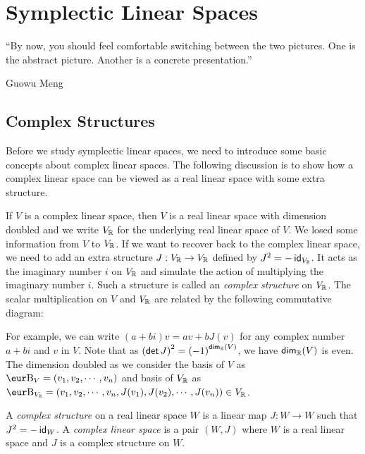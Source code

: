 \chapter{Symplectic Linear Spaces}

\epigraph{``By now, you should feel comfortable switching between the two pictures. One is the abstract picture. Another is a concrete presentation.''}{Guowu Meng}

\section{Complex Structures}

Before we study symplectic linear spaces, we need to introduce some basic concepts about complex linear spaces. The following discussion is to show how a complex linear space can be viewed as a real linear space with some extra structure.

If $V$ is a complex linear space, then $V$ is a real linear space with dimension doubled and we write $V_{\operatorname{\mathbb{R}}}$ for the underlying real linear space of $V$. We losed some information from $V$ to $V_{\operatorname{\mathbb{R}}}$. If we want to recover back to the complex linear space, we need to add an extra structure $J : V_{\operatorname{\mathbb{R}}} \to V_{\operatorname{\mathbb{R}}}$ defined by $J^2 = -\operatorname{\text{\normalfont\sffamily id}}_{V_{\operatorname{\mathbb{R}}}}$. It acts as the imaginary number $i$ on $V_{\operatorname{\mathbb{R}}}$ and simulate the action of multiplying the imaginary number $i$. Such a structure is called an \emph{complex structure} on $V_{\operatorname{\mathbb{R}}}$. The scalar multiplication on $V$ and $V_{\operatorname{\mathbb{R}}}$ are related by the following commutative diagram:
\begin{center}
\end{center}
For example, we can write $(a + bi) v = a v + b J(v)$ for any complex number $a + bi$ and $v$ in $V$. Note that as ${(\operatorname{\text{\normalfont\sffamily det}} J)}^2 = {(-1)}^{\operatorname{\text{\normalfont\sffamily dim}}_{\operatorname{\mathbb{R}}}(V)}$, we have $\operatorname{\text{\normalfont\sffamily dim}}_{\operatorname{\mathbb{R}}}(V)$ is even. The dimension doubled as we consider the basis of $V$ as $\B_V = (v_1, v_2, \cdots, v_n)$ and basis of $V_{\operatorname{\mathbb{R}}}$ as $\B_{V_{\R}} = (v_1, v_2, \cdots, v_n, J(v_1), J(v_2), \cdots, J(v_n)) \in V_{\R}$.

\begin{definition}
	A \emph{complex structure} on a real linear space $W$ is a linear map $J : W \to W$ such that $J^2 = -\operatorname{\text{\normalfont\sffamily id}}_W$. A \emph{complex linear space} is a pair $(W, J)$ where $W$ is a real linear space and $J$ is a complex structure on $W$.
\end{definition}

